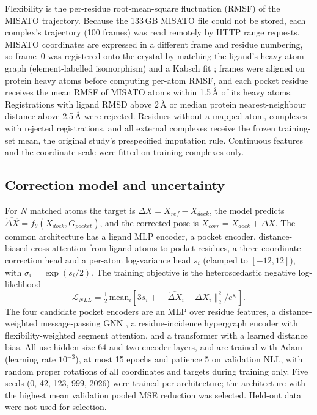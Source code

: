 Flexibility is the per-residue root-mean-square fluctuation (RMSF) of the MISATO trajectory. Because the 133\,GB MISATO
file could not be stored, each complex's trajectory (100 frames) was read remotely by HTTP range requests. MISATO
coordinates are expressed in a different frame and residue numbering, so frame~0 was registered onto the crystal by
matching the ligand's heavy-atom graph (element-labelled isomorphism) and a Kabsch fit \citep{kabsch1976}; frames were
aligned on protein heavy atoms before computing per-atom RMSF, and each pocket residue receives the mean RMSF of MISATO
atoms within 1.5\,\AA{} of its heavy atoms. Registrations with ligand RMSD above 2\,\AA{} or median protein
nearest-neighbour distance above 2.5\,\AA{} were rejected. Residues without a mapped atom, complexes with rejected
registrations, and all external complexes receive the frozen training-set mean, the original study's prespecified
imputation rule. Continuous features and the coordinate scale were fitted on training complexes only.

\subsection{Correction model and uncertainty}
For $N$ matched atoms the target is $\Delta X = X_{ref} - X_{dock}$, the model predicts
$\hat{\Delta X} = f_\theta(X_{dock}, G_{pocket})$, and the corrected pose is $X_{corr} = X_{dock} + \hat{\Delta X}$.
The common architecture has a ligand MLP encoder, a pocket encoder, distance-biased cross-attention from ligand atoms to
pocket residues, a three-coordinate correction head and a per-atom log-variance head $s_i$ (clamped to $[-12,12]$), with
$\sigma_i = \exp(s_i/2)$. The training objective is the heteroscedastic negative log-likelihood
\begin{equation}
\mathcal{L}_{NLL} = \tfrac{1}{2}\,\mathrm{mean}_i\!\left[3 s_i + \lVert \hat{\Delta X}_i - \Delta X_i \rVert_2^2 / e^{s_i}\right].
\end{equation}
The four candidate pocket encoders are an MLP over residue features, a distance-weighted message-passing GNN
\citep{gilmer2017mpnn}, a residue-incidence hypergraph encoder with flexibility-weighted segment attention, and a
transformer with a learned distance bias. All use hidden size 64 and two encoder layers, and are trained with Adam
(learning rate $10^{-3}$), at most 15 epochs and patience 5 on validation NLL, with random proper rotations of all
coordinates and targets during training only. Five seeds (0, 42, 123, 999, 2026) were trained per architecture; the
architecture with the highest mean validation pooled MSE reduction was selected. Held-out data were not used for
selection.

